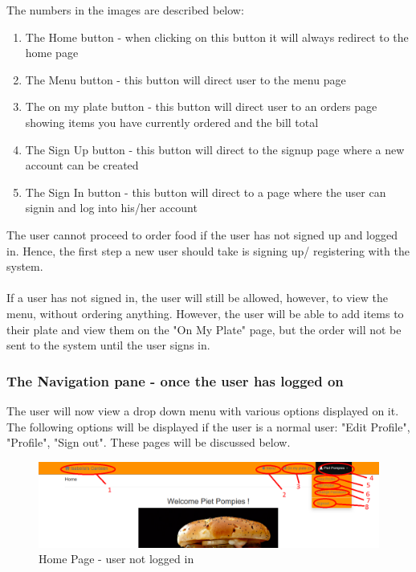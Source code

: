 \documentclass[a4paper,12pt]{report}
\begin{document}
The numbers in the images are described below:

\begin{enumerate}
\item The Home button - when clicking on this button it will always redirect to the home page
\item The Menu button - this button will direct user to the menu page
\item The on my plate button - this button will direct user to an orders page showing items you have currently ordered and the bill total
\item The Sign Up button - this button will direct to the signup page where a new account can be created
\item The Sign In button - this button will direct to a page where the user can signin and log into his/her account
\end{enumerate}

The user cannot proceed to order food if the user has not signed up and logged in. Hence, the first step a new user should take is signing up/ registering with the system. 
\\ \\
If a user has not signed in, the user will still be allowed, however, to view the menu, without ordering anything. However, the user will be able to add items to their plate and view them on the "On My Plate" page, but the order will not be sent to the system until the user signs in.


\subsubsection{The Navigation pane - once the user has logged on}
The user will now view a drop down menu with various options displayed on it. The following options will be displayed if the user is a normal user: "Edit Profile", "Profile", "Sign out". These pages will be discussed below.

\begin{figure}[H]
  \centering
    \includegraphics[width=1.0\textwidth]{screenshots/HomePage2.PNG}
    \caption{Home Page - user not logged in } 
\end{figure}
\end{document}
